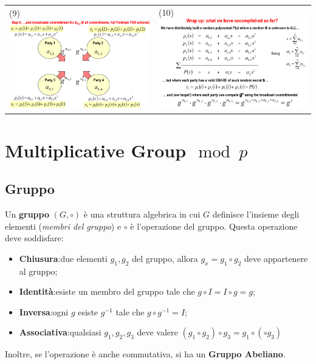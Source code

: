 \documentclass{book}
\begin{document}
\begin{tabularx}{0.99\textwidth}{X X}
    \\
    (9)\includegraphics[scale=0.4]{2022-01-02-16-07-44.png}%
     &
    (10)\includegraphics[scale=0.4]{2022-01-02-16-27-48.png}%
\end{tabularx}
\chapter{Multiplicative Group\(\mod{p}\)}
\section{Gruppo}
Un \textbf{gruppo} \((G,\circ )\) è una struttura algebrica in cui \(G\) definisce l'insieme degli elementi (\emph{membri del gruppo}) e \(\circ \) è l'operazione del gruppo\@. Questa operazione deve soddisfare:\begin{itemize}
    \item \textbf{Chiusura}:\@presi due elementi \(g_{1},g_{2}\) del gruppo, allora \(g_{x}=g_{1}\circ g_{2}\) deve appartenere al gruppo;
    \item \textbf{Identità}:\@deve esiste un membro del gruppo tale che \(g\circ I = I\circ g=g\);
    \item \textbf{Inversa}:\@per ogni \(g\) esiste \(g^{-1}\) tale che \(g\circ g^{-1}=I\);
    \item \textbf{Associativa}:\@per qualsiasi \(g_{1},g_{2},g_{3}\) deve valere \((g_{1}\circ g_{2})\circ g_{3}=g_{1}\circ (\circ g_{3})\)
\end{itemize}
Inoltre, se l'operazione è anche commutativa, si ha un \textbf{Gruppo Abeliano}\@.
\end{document}
